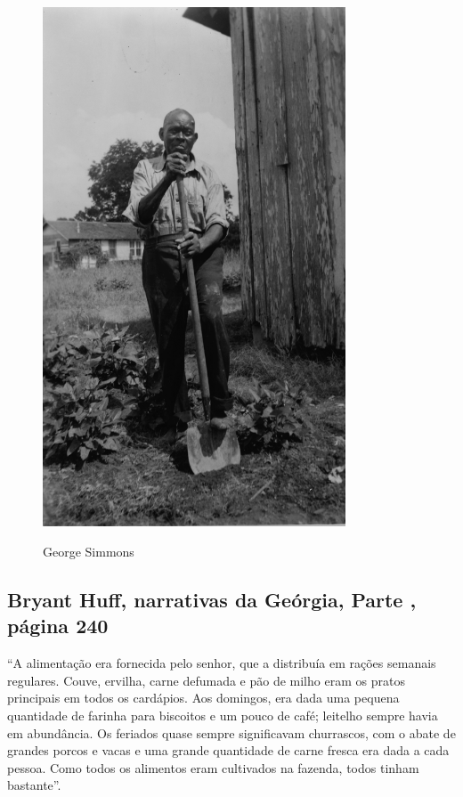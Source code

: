 \begin{figure}[]
\centering
 \includegraphics[width=90mm]{./imgs/geosimmons_recorte.jpg} \label{img5}
\caption{George Simmons}
\end{figure}

\subsection{Bryant Huff, narrativas da Geórgia, Parte , página 240}
\label{ref151}

``A alimentação era fornecida pelo senhor, que a distribuía em rações
semanais regulares. Couve, ervilha, carne defumada e pão de milho eram
os pratos principais em todos os cardápios. Aos domingos, era dada uma
pequena quantidade de farinha para biscoitos e um pouco de café;
leitelho sempre havia em abundância. Os feriados quase sempre
significavam churrascos, com o abate de grandes porcos e vacas e uma
grande quantidade de carne fresca era dada a cada pessoa. Como todos os
alimentos eram cultivados na fazenda, todos tinham bastante''.


